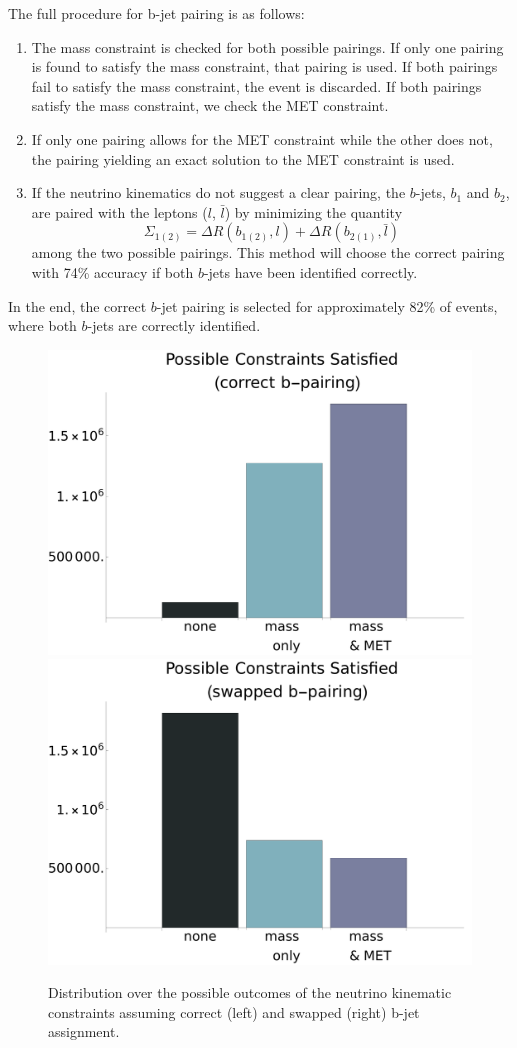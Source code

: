 The full procedure for b-jet pairing is as follows:
\begin{enumerate}

    \item The mass constraint is checked for both possible pairings. If only one pairing is found to satisfy the mass constraint, that pairing is used. If both pairings fail to satisfy the mass constraint, the event is discarded. If both pairings satisfy the mass constraint, we check the MET constraint.
    \item If only one pairing allows for the MET constraint while the other does not, the pairing yielding an exact solution to the MET constraint is used.
    \item If the neutrino kinematics do not suggest a clear pairing, the $b$-jets, $b_1$ and $b_2$, are paired with the leptons ($l$, $\bar{l}$) by minimizing the quantity $$ \Sigma_{1(2)} =\Delta R(b_{1(2)},l)+ \Delta R(b_{2(1)},\bar{l})$$ among the two possible pairings. This method will choose the correct pairing with 74\% accuracy if both $b$-jets have been identified correctly. 

\end{enumerate}
In the end, the correct $b$-jet pairing is selected for approximately 82\% of events, where both $b$-jets are correctly identified.

\begin{figure}
    \centering
    \includegraphics[width=.48\linewidth]{figs/bars_right.pdf} 
    \includegraphics[width=.48\linewidth]{figs/bars_swap.pdf}
    \caption{Distribution over the possible outcomes of the neutrino kinematic constraints assuming correct (left) and swapped (right) b-jet assignment. 
    }
    \label{fig:bars}
\end{figure}

